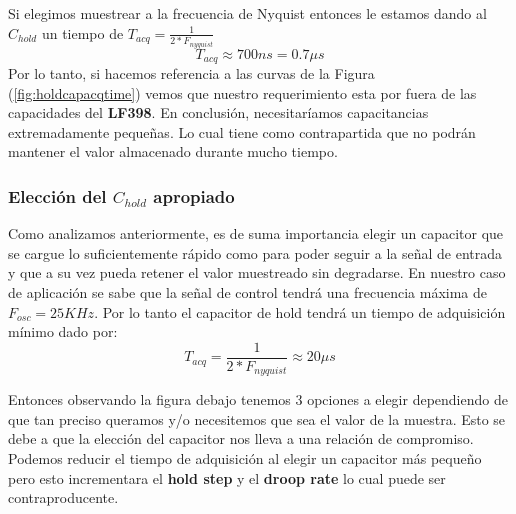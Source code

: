 Si elegimos muestrear a la frecuencia de Nyquist entonces le estamos dando al $C_{hold}$ un tiempo de $T_{acq}=\frac{1}{2*F_{nyquist}}$
$$T_{acq}\approx 700ns = 0.7\mu s$$
Por lo tanto, si hacemos referencia a las curvas de la Figura (\ref{fig:holdcapacqtime}) vemos que nuestro requerimiento esta por fuera de las capacidades del \textbf{LF398}. En conclusión, necesitaríamos capacitancias extremadamente pequeñas. Lo cual tiene como contrapartida que no podrán mantener el valor almacenado durante mucho tiempo.
\subsubsection{Elección del $C_{hold}$ apropiado}
Como analizamos anteriormente, es de suma importancia elegir un capacitor que se cargue lo suficientemente rápido como para poder seguir a la señal de entrada y que a su vez pueda retener el valor muestreado sin degradarse. 
En nuestro caso de aplicación se sabe que la señal de control tendrá una frecuencia máxima de $F_{osc}=25KHz$. Por lo tanto el capacitor de hold tendrá un tiempo de adquisición mínimo dado por:
$$T_{acq}=\frac{1}{2*F_{nyquist}}\approx20\mu s$$

Entonces observando la figura debajo tenemos 3 opciones a elegir dependiendo de que tan preciso queramos y/o necesitemos que sea el valor de la muestra. Esto se debe a que la elección del capacitor nos lleva a una relación de compromiso. Podemos reducir el tiempo de adquisición al elegir un capacitor más pequeño pero esto incrementara el \textbf{hold step} y el \textbf{droop rate} lo cual puede ser contraproducente.

